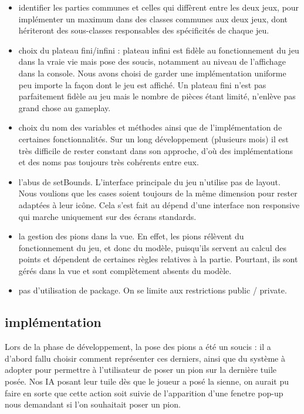 \documentclass{article}
\begin{document}
\begin{itemize}
  \item  identifier les parties communes et celles qui diffèrent entre les deux jeux, pour implémenter un maximum dans des classes communes aux deux jeux, dont hériteront des sous-classes responsables des spécificités de chaque jeu.
  \item choix du plateau fini/infini : plateau infini est fidèle au fonctionnement du jeu dans la vraie vie mais pose des soucis, notamment au niveau de l'affichage dans la console. Nous avons choisi de garder une implémentation uniforme peu importe la façon dont le jeu est affiché. Un plateau fini n'est pas parfaitement fidèle au jeu mais le nombre de pièces étant limité, n'enlève pas grand chose au gameplay.
  \item choix du nom des variables et méthodes ainsi que de l'implémentation de certaines fonctionnalités. Sur un long développement (plusieurs mois) il est très difficile de rester constant dans son approche, d'où des implémentations et des noms pas toujours très cohérents entre eux.
  \item l'abus de setBounds. L'interface principale du jeu n'utilise pas de layout. Nous voulions que les cases soient toujours de la même dimension pour rester adaptées à leur icône. Cela s'est fait au dépend d'une interface non responsive qui marche uniquement sur des écrans standards.
  \item la gestion des pions dans la vue. En effet, les pions rélèvent du fonctionnement du jeu, et donc du modèle, puisqu'ils servent au calcul des points et dépendent de certaines règles relatives à la partie. Pourtant, ils sont gérés dans la vue et sont complètement absents du modèle.
  \item pas d'utilisation de package. On se limite aux restrictions public / private.
\end{itemize}

\subsection{implémentation}

Lors de la phase de développement, la pose des pions a été un soucis : il a d'abord fallu choisir comment représenter ces derniers, ainsi que du système à adopter pour permettre à l'utilisateur de poser un pion sur la dernière tuile posée. Nos IA posant leur tuile dès que le joueur a posé la sienne, on aurait pu faire en sorte que cette action soit suivie de l'apparition d'une fenetre pop-up nous demandant si l'on souhaitait poser un pion. 
\end{document}
